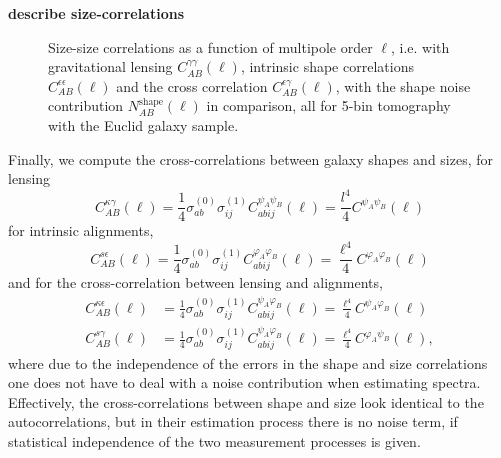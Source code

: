 \documentclass[a4paper,fleqn,usenatbib]{mnras}
\def\spirou#1{{\bf #1}}
\begin{document}
\spirou{describe size-correlations}


\begin{figure}
\centering
\caption{Size-size correlations as a function of multipole order $\ell$, i.e. with gravitational lensing $C_{AB}^{\gamma\gamma}(\ell)$, intrinsic shape correlations $C_{AB}^{\epsilon\epsilon}(\ell)$ and the cross correlation $C_{AB}^{\epsilon\gamma}(\ell)$, with the shape noise contribution $N_{AB}^\mathrm{shape}(\ell)$ in comparison, all for 5-bin tomography with the Euclid galaxy sample.}
\label{fig:sizesize}
\end{figure}


Finally, we compute the cross-correlations between galaxy shapes and sizes, for lensing
\begin{equation}
C_{AB}^{\kappa\gamma}(\ell) = \frac{1}{4}\sigma^{(0)}_{ab}\sigma^{(1)}_{ij}C^{\psi_A\psi_B}_{abij}(\ell) = \frac{l^4}{4}C^{\psi_A\psi_B}(\ell)
\end{equation}
for intrinsic alignments,
\begin{equation}
C_{AB}^{s\epsilon}(\ell) = \frac{1}{4}\sigma^{(0)}_{ab}\sigma^{(1)}_{ij}C^{\varphi_A\varphi_B}_{abij}(\ell) = \frac{\ell^4}{4}C^{\varphi_A\varphi_B}(\ell)
\end{equation}
and for the cross-correlation between lensing and alignments,
\begin{align}
C_{AB}^{\kappa\epsilon}(\ell) & = \frac{1}{4}\sigma^{(0)}_{ab}\sigma^{(1)}_{ij}C^{\psi_A\varphi_B}_{abij}(\ell) = \frac{\ell^4}{4}C^{\psi_A\varphi_B}(\ell)\\
C_{AB}^{s\gamma}(\ell) & = \frac{1}{4}\sigma^{(0)}_{ab}\sigma^{(1)}_{ij}C^{\psi_A\varphi_B}_{abij}(\ell) = \frac{\ell^4}{4}C^{\varphi_A\psi_B}(\ell),
\end{align}
where due to the independence of the errors in the shape and size correlations one does not have to deal with a noise contribution when estimating spectra. Effectively, the cross-correlations between shape and size look identical to the autocorrelations, but in their estimation process there is no noise term, if statistical independence of the two measurement processes is given.


\end{document}
